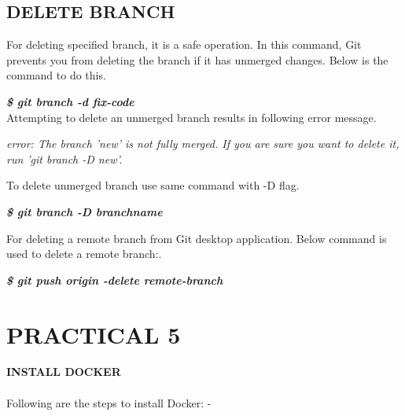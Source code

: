 \documentclass[12pt]{article}
\begin{document}
\subsection{DELETE BRANCH}
For deleting specified branch, it is a safe operation. In this command, Git prevents you from deleting the branch if it has unmerged changes. Below is the command to do this.\\

\vspace{1 mm}

\textit{\textbf{\$ git branch -d fix-code}}\\

Attempting to delete an unmerged branch results in following error message.\\

\vspace{1 mm}

\textit{error: The branch 'new' is not fully merged.
If you are sure you want to delete it, run 'git branch -D new'.}\\

\vspace{1 mm}

To delete unmerged branch use same command with -D flag.\\

\vspace{1mm}

\textit{\textbf{\$ git branch -D branchname}}\\

\vspace{1mm}

For deleting a remote branch from Git desktop application. Below command is used to delete a remote branch:.\\
\vspace{1 mm}

\textit{\textbf{\$ git push origin -delete remote-branch}}\\

\clearpage

\section{PRACTICAL 5}

\textbf{\uppercase {Install Docker}} \\
\vspace{0.1\baselineskip} \\

Following are the steps to install Docker: -
\end{document}
